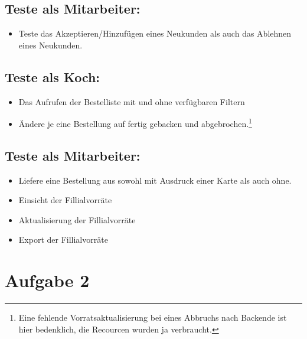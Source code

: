 \documentclass[a4paper]{report}
\begin{document}
\subsection*{Teste als Mitarbeiter:}
\begin{itemize}
 \item Teste das Akzeptieren/Hinzufügen eines Neukunden als auch das Ablehnen eines Neukunden. 
\end{itemize}

\subsection*{Teste als Koch:}
\begin{itemize}
 \item Das Aufrufen der Bestelliste mit und ohne verfügbaren Filtern
 \item Ändere je eine Bestellung auf fertig gebacken und abgebrochen.\footnote{Eine fehlende Vorratsaktualisierung bei eines Abbruchs nach Backende ist hier bedenklich, die Recourcen wurden ja verbraucht.}
\end{itemize}


\subsection*{Teste als Mitarbeiter:}
\begin{itemize}
 \item Liefere eine Bestellung aus sowohl mit Ausdruck einer Karte als auch ohne.
 \item Einsicht der Fillialvorräte
 \item Aktualisierung der Fillialvorräte
 \item Export der Fillialvorräte
\end{itemize}




\newpage
\section*{Aufgabe 2}






\end{document}
